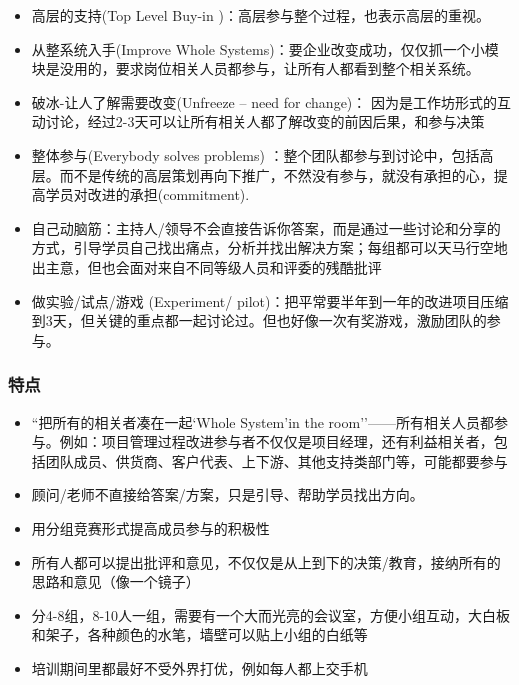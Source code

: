 \begin{itemize}
\tightlist
\item
  高层的支持(Top Level Buy-in )：高层参与整个过程，也表示高层的重视。
\item
  从整系统入手(Improve Whole
  Systems)：要企业改变成功，仅仅抓一个小模块是没用的，要求岗位相关人员都参与，让所有人都看到整个相关系统。
\item
  破冰-让人了解需要改变(Unfreeze -- need for change)：
  因为是工作坊形式的互动讨论，经过2-3天可以让所有相关人都了解改变的前因后果，和参与决策
\item
  整体参与(Everybody solves problems)
  ：整个团队都参与到讨论中，包括高层。而不是传统的高层策划再向下推广，不然没有参与，就没有承担的心，提高学员对改进的承担(commitment).
\item
  自己动脑筋：主持人/领导不会直接告诉你答案，而是通过一些讨论和分享的方式，引导学员自己找出痛点，分析并找出解决方案；每组都可以天马行空地出主意，但也会面对来自不同等级人员和评委的残酷批评
\item
  做实验/试点/游戏 (Experiment/
  pilot)：把平常要半年到一年的改进项目压缩到3天，但关键的重点都一起讨论过。但也好像一次有奖游戏，激励团队的参与。
\end{itemize}

\hypertarget{ux7279ux70b9}{%
\subsubsection{特点}\label{ux7279ux70b9}}

\begin{itemize}
\tightlist
\item
  ``把所有的相关者凑在一起`Whole System'in the
  room''------所有相关人员都参与。例如：项目管理过程改进参与者不仅仅是项目经理，还有利益相关者，包括团队成员、供货商、客户代表、上下游、其他支持类部门等，可能都要参与
\end{itemize}

\begin{description}
\item[]
\end{description}

\begin{itemize}
\tightlist
\item
  顾问/老师不直接给答案/方案，只是引导、帮助学员找出方向。
\item
  用分组竞赛形式提高成员参与的积极性
\item
  所有人都可以提出批评和意见，不仅仅是从上到下的决策/教育，接纳所有的思路和意见（像一个镜子）
\item
  分4-8组，8-10人一组，需要有一个大而光亮的会议室，方便小组互动，大白板和架子，各种颜色的水笔，墙壁可以贴上小组的白纸等
\item
  培训期间里都最好不受外界打优，例如每人都上交手机
\end{itemize}

